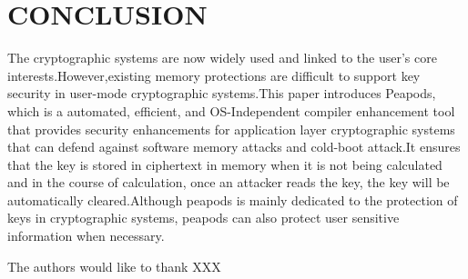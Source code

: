 
\section{CONCLUSION}
The cryptographic systems are now widely used and linked to the user's core interests.However,existing memory protections are difficult to support key security in user-mode cryptographic systems.This paper introduces Peapods, which is a automated, efficient, and OS-Independent compiler enhancement tool that provides security enhancements for application layer cryptographic systems that can defend against software memory attacks and cold-boot attack.It ensures that the key is stored in ciphertext in memory when it is not being calculated and in the course of calculation, once an attacker reads the key, the key will be automatically cleared.Although peapods is mainly dedicated to the protection of keys in cryptographic systems, peapods can also protect user sensitive information when necessary.

\begin{acks}

The authors would like to thank XXX


\end{acks}


